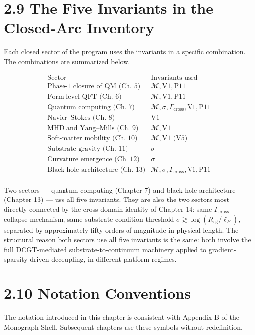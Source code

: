 \documentclass[11pt]{book}
\begin{document}
\section{2.9 The Five Invariants in the Closed-Arc Inventory}

Each closed sector of the program uses the invariants in a specific combination. The combinations are summarized below.

\[
\begin{array}{l|l}
\text{Sector} & \text{Invariants used} \\
\hline
\text{Phase-1 closure of QM (Ch. 5)} & \mathcal{M}, \text{V1}, \text{P11} \\
\text{Form-level QFT (Ch. 6)} & \mathcal{M}, \text{V1}, \text{P11} \\
\text{Quantum computing (Ch. 7)} & \mathcal{M}, \sigma, \Gamma_\mathrm{cross}, \text{V1}, \text{P11} \\
\text{Navier–Stokes (Ch. 8)} & \text{V1} \\
\text{MHD and Yang–Mills (Ch. 9)} & \mathcal{M}, \text{V1} \\
\text{Soft-matter mobility (Ch. 10)} & \mathcal{M}, \text{V1 (V5)} \\
\text{Substrate gravity (Ch. 11)} & \sigma \\
\text{Curvature emergence (Ch. 12)} & \sigma \\
\text{Black-hole architecture (Ch. 13)} & \mathcal{M}, \sigma, \Gamma_\mathrm{cross}, \text{V1}, \text{P11} \\
\end{array}
\]

Two sectors — quantum computing (Chapter 7) and black-hole architecture (Chapter 13) — use all five invariants. They are also the two sectors most directly connected by the cross-domain identity of Chapter 14: same $\Gamma_\mathrm{cross}$ collapse mechanism, same substrate-condition threshold $\sigma \gtrsim \log(R_\mathrm{cg}/\ell_P)$, separated by approximately fifty orders of magnitude in physical length. The structural reason both sectors use all five invariants is the same: both involve the full DCGT-mediated substrate-to-continuum machinery applied to gradient-sparsity-driven decoupling, in different platform regimes.

\section{2.10 Notation Conventions}

The notation introduced in this chapter is consistent with Appendix B of the Monograph Shell. Subsequent chapters use these symbols without redefinition.
\end{document}
